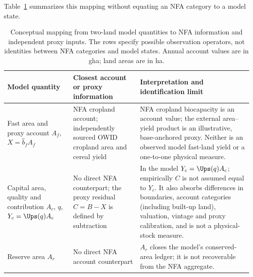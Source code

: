 Table~\ref{tab:si_model_nfa} summarizes this mapping without equating an NFA category to a model state.

\begin{table}[htbp]
\centering\small
\caption{Conceptual mapping from two-land model quantities to NFA information and independent proxy inputs. The rows specify possible observation operators, not identities between NFA categories and model states. Annual account values are in gha; land areas are in ha.}
\label{tab:si_model_nfa}
\begin{tabularx}{\textwidth}{>{\raggedright\arraybackslash}p{} >{\raggedright\arraybackslash}p{} X}
\toprule
Model quantity & Closest account or proxy information & Interpretation and identification limit \\
\midrule
Fast area and proxy account $A_f$, $X=\hat b_fA_f$ & NFA cropland account; independently sourced OWID cropland area and cereal yield & NFA cropland biocapacity is an account value; the external area--yield product is an illustrative, base-anchored proxy. Neither is an observed model fast-land yield or a one-to-one physical measure. \\
Capital area, quality and contribution $A_c$, $q$, $Y_c=\Ups(q)A_c$ & No direct NFA counterpart; the proxy residual $C=B-X$ is defined by subtraction & In the model $Y_c=\Ups(q)A_c$; empirically $C$ is not assumed equal to $Y_c$. It also absorbs differences in boundaries, account categories (including built-up land), valuation, vintage and proxy calibration, and is not a physical-stock measure. \\
Reserve area $A_r$ & No direct NFA account counterpart & $A_r$ closes the model's conserved-area ledger; it is not recoverable from the NFA aggregate. \\
\bottomrule
\end{tabularx}
\end{table}

